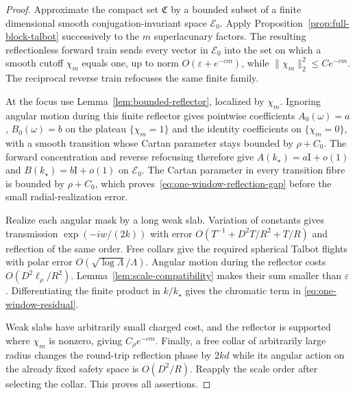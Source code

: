 \documentclass[11pt]{article}
\theoremstyle{remark}
\newcommand{\Id}{\mathrm I}
\begin{document}
\begin{proof}
Approximate the compact set $\mathfrak C$ by a bounded subset of a finite
dimensional smooth conjugation-invariant space $\mathcal E_0$.  Apply
Proposition~\ref{prop:full-block-talbot} successively to the $m$
superlacunary factors.  The resulting reflectionless forward train sends
every vector in $\mathcal E_0$ into the set on which a smooth cutoff
$\chi_m$ equals one, up to norm $O(\varepsilon+e^{-cm})$, while
$\|\chi_m\|_2^2\leq Ce^{-cm}$.  The reciprocal reverse train refocuses the
same finite family.

At the focus use Lemma~\ref{lem:bounded-reflector}, localized by
$\chi_m$.  Ignoring angular motion during this finite reflector gives
pointwise coefficients $A_0(\omega)=a$, $B_0(\omega)=b$ on the plateau
$\{\chi_m=1\}$ and the identity coefficients on $\{\chi_m=0\}$, with a
smooth transition whose Cartan parameter stays bounded by $\rho+C_0$.
The forward concentration and reverse refocusing therefore give
$A(k_\star)=a\Id+o(1)$ and $B(k_\star)=b\Id+o(1)$ on
$\mathcal E_0$.  The Cartan parameter in every transition fibre is bounded
by $\rho+C_0$, which proves~\eqref{eq:one-window-reflection-gap} before the
small radial-realization error.

Realize each angular mask by a long weak slab.  Variation of constants gives
transmission $\exp(-iw/(2k))$ with error
$O(T^{-1}+D^2T/R^2+T/R)$ and reflection of the same order.  Free collars give
the required spherical Talbot flights with polar error
$O(\sqrt{\log\Lambda}/\Lambda)$.  Angular motion during the reflector costs
$O(D^2\ell_\rho/R^2)$.  Lemma~\ref{lem:scale-compatibility} makes their sum
smaller than $\varepsilon$.  Differentiating the finite product in
$k/k_\star$ gives the chromatic term in
\eqref{eq:one-window-residual}.

Weak slabs have arbitrarily small charged cost, and the reflector is supported
where $\chi_m$ is nonzero, giving $C_\rho e^{-cm}$.  Finally, a free collar
of arbitrarily large radius changes the round-trip reflection phase by
$2kd$ while its angular action on the already fixed safety space is
$O(D^2/R)$.  Reapply the scale order after selecting the collar.  This proves
all assertions.
\end{proof}
\end{document}
